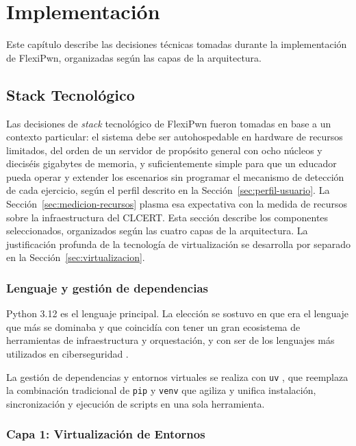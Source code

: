 \chapter{Implementación}
\label{sec:implementacion}

Este capítulo describe las decisiones técnicas tomadas durante la implementación
de FlexiPwn, organizadas según las capas de la arquitectura.

\section{Stack Tecnológico}

Las decisiones de \textit{stack} tecnológico de FlexiPwn fueron tomadas en base
a un contexto particular: el sistema debe ser autohospedable en hardware de
recursos limitados, del orden de un servidor de propósito general con ocho
núcleos y dieciséis gigabytes de memoria, y suficientemente simple para que un
educador pueda operar y extender los escenarios sin programar el mecanismo de
detección de cada ejercicio, según el perfil descrito en la
Sección~\ref{sec:perfil-usuario}. La
Sección~\ref{sec:medicion-recursos} plasma esa expectativa con la medida 
de recursos sobre la infraestructura del CLCERT. Esta sección describe
los componentes seleccionados, organizados según las cuatro capas de la
arquitectura. La justificación profunda de la tecnología de virtualización se
desarrolla por separado en la Sección~\ref{sec:virtualizacion}.

\subsection{Lenguaje y gestión de dependencias}

Python 3.12 es el lenguaje principal. La elección se sostuvo en que era el
lenguaje que más se dominaba y que coincidía con tener un gran ecosistema de
herramientas de infraestructura y orquestación, y con ser de los lenguajes más
utilizados en ciberseguridad \cite{hackthebox-cybersecurity-languages}.

La gestión de dependencias y entornos virtuales se realiza con \texttt{uv}
\cite{astral-uv}, que reemplaza la combinación tradicional de \texttt{pip} y
\texttt{venv} que agiliza y unifica instalación, sincronización y ejecución de
scripts en una sola herramienta.

\subsection{Capa 1: Virtualización de Entornos}

